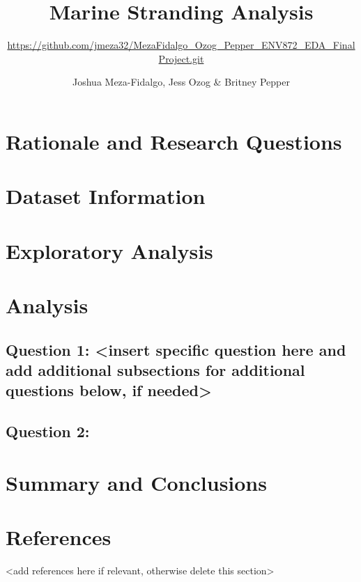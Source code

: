 \documentclass[
  12pt,
]{article}
\title{Marine Stranding Analysis}
\subtitle{\url{https://github.com/jmeza32/MezaFidalgo_Ozog_Pepper_ENV872_EDA_FinalProject.git}}
\author{Joshua Meza-Fidalgo, Jess Ozog \& Britney Pepper}
\date{}
\begin{document}
\maketitle

\newpage
\tableofcontents 
\newpage
\listoftables 
\newpage
\listoffigures 
\newpage

\hypertarget{rationale-and-research-questions}{%
\section{Rationale and Research
Questions}\label{rationale-and-research-questions}}

\newpage

\hypertarget{dataset-information}{%
\section{Dataset Information}\label{dataset-information}}

\newpage

\hypertarget{exploratory-analysis}{%
\section{Exploratory Analysis}\label{exploratory-analysis}}

\newpage

\hypertarget{analysis}{%
\section{Analysis}\label{analysis}}

\hypertarget{question-1-insert-specific-question-here-and-add-additional-subsections-for-additional-questions-below-if-needed}{%
\subsection{Question 1: \textless insert specific question here and add
additional subsections for additional questions below, if
needed\textgreater{}}\label{question-1-insert-specific-question-here-and-add-additional-subsections-for-additional-questions-below-if-needed}}

\hypertarget{question-2}{%
\subsection{Question 2:}\label{question-2}}

\newpage

\hypertarget{summary-and-conclusions}{%
\section{Summary and Conclusions}\label{summary-and-conclusions}}

\newpage

\hypertarget{references}{%
\section{References}\label{references}}

\textless add references here if relevant, otherwise delete this
section\textgreater{}
\end{document}
